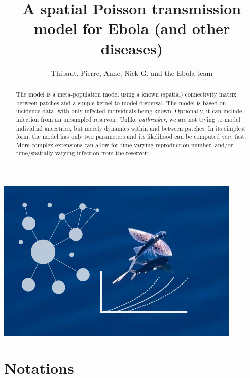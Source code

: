 \documentclass[a4paper,11pt]{article}
\title{A spatial Poisson transmission model for Ebola (and other diseases)}
\author{Thibaut, Pierre, Anne, Nick G. and the Ebola team}
\begin{document}
\maketitle

\begin{center}
\includegraphics{figs/spatialPoisson} 
\end{center}

\begin{abstract}
The model is a meta-population model using a known (spatial) connectivity matrix between patches and a simple kernel to model dispersal. 
The model is based on incidence data, with only infected individuals being 
known.
Optionally, it can include infection from an unsampled reservoir.
Unlike \textit{outbreaker}, we are not trying to model individual ancestries, 
but merely dynamics within and between patches.
In its simplest form, the model has only two parameters and its likelihood can 
be computed very fast.
More complex extensions can allow for time-varying reproduction number, and/or 
time/spatially varying infection from the reservoir.
\end{abstract}

\newpage
\section{Notations}
\end{document}
